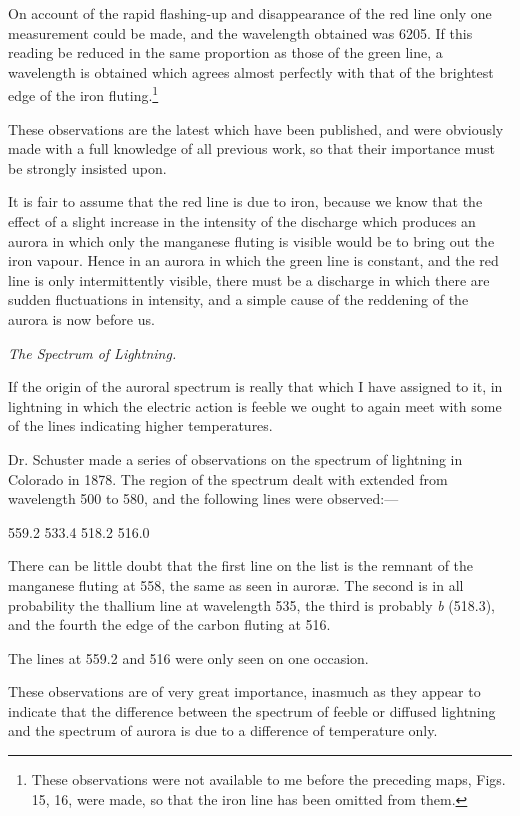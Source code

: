 \documentclass[a4paper, 12pt, oneside, polutonikogreek, english]{article}
\begin{document}
On account of the rapid flashing-up and disappearance of the red line only one measurement could be made, and the wavelength obtained was 6205. If this reading be reduced in the same proportion as those of the green line, a wavelength is obtained which agrees almost perfectly with that of the brightest edge of the iron fluting.\footnote{These observations were not available to me before the preceding maps, Figs. 15, 16, were made, so that the iron line has been omitted from them.}

These observations are the latest which have been published, and were obviously made with a full knowledge of all previous work, so that their importance must be strongly insisted upon.

It is fair to assume that the red line is due to iron, because we know that the effect of a slight increase in the intensity of the discharge which produces an aurora in which only the manganese fluting is visible would be to bring out the iron vapour. Hence in an aurora in which the green line is constant, and the red line is only intermittently visible, there must be a discharge in which there are sudden fluctuations in intensity, and a simple cause of the reddening of the aurora is now before us.

\emph{The Spectrum of Lightning.}

If the origin of the auroral spectrum is really that which I have assigned to it, in lightning in which the electric action is feeble we ought to again meet with some of the lines indicating higher temperatures.

Dr. Schuster made a series of observations on the spectrum of lightning in Colorado in 1878. The region of the spectrum dealt with extended from wavelength 500 to 580, and the following lines were observed:---

559.2 
533.4 
518.2 
516.0 

There can be little doubt that the first line on the list is the remnant of the manganese fluting at 558, the same as seen in auroræ. The second is in all probability the thallium line at wavelength 535, the third is probably \emph{b} (518.3), and the fourth the edge of the carbon fluting at 516.

The lines at 559.2 and 516 were only seen on one occasion.

These observations are of very great importance, inasmuch as they appear to indicate that the difference between the spectrum of feeble or diffused lightning and the spectrum of aurora is due to a difference of temperature only.
\end{document}
